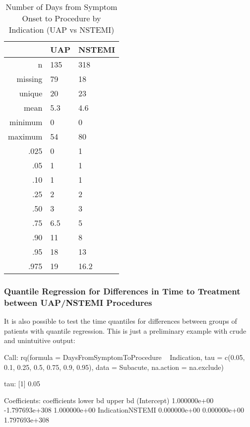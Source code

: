 \documentclass[presentation,xcolor=pdftex,dvipsnames,table,11pt]{beamer}
\begin{document}
\begin{tiny}
\begin{frame}
\begin{table}[ht]
\centering
\begin{tabular}{rll}
  \toprule
 & UAP & NSTEMI \\ 
  \midrule
n & 135 & 318 \\ 
  missing & 79 & 18 \\ 
  unique & 20 & 23 \\ 
  mean & 5.3 & 4.6 \\ 
  minimum & 0 & 0 \\ 
  maximum & 54 & 80 \\ 
  .025 & 0 & 1 \\ 
  .05 & 1 & 1 \\ 
  .10 & 1 & 1 \\ 
  .25 & 2 & 2 \\ 
  .50 & 3 & 3 \\ 
  .75 & 6.5 & 5 \\ 
  .90 & 11 & 8 \\ 
  .95 & 18 & 13 \\ 
  .975 & 19 & 16.2 \\ 
   \bottomrule
\end{tabular}
\caption{Number of Days from Symptom Onset to Procedure by Indication (UAP vs NSTEMI)} 
\label{Summary_Symptom_to_Procedure_by_Indication}
\end{table}\end{frame}



\subsubsection{Quantile Regression for Differences in Time to Treatment between UAP/NSTEMI Procedures}

\begin{frame}
It is also possible to test the time quantiles for differences between groups of patients with quantile regression. This is just a preliminary example with crude and unintuitive output:
\begin{Schunk}
\begin{Soutput}
Call: rq(formula = DaysFromSymptomToProcedure ~ Indication, tau = c(0.05, 
    0.1, 0.25, 0.5, 0.75, 0.9, 0.95), data = Subacute, na.action = na.exclude)

tau: [1] 0.05

Coefficients:
                 coefficients   lower bd       upper bd      
(Intercept)        1.000000e+00 -1.797693e+308   1.000000e+00
IndicationNSTEMI   0.000000e+00   0.000000e+00  1.797693e+308


\end{Soutput}
\end{Schunk}
\end{frame}
\end{tiny}
\end{document}

